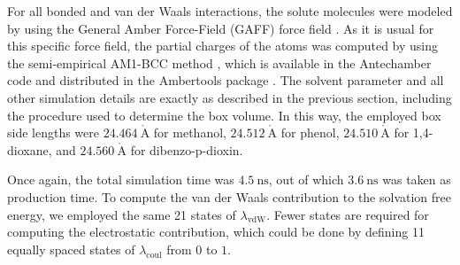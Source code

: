 \documentclass[
aip,
jcp,
reprint,
]{revtex4-1}
\renewcommand{\AA}{\mathring{A}}                       %
\begin{document}
For all bonded and van der Waals interactions, the solute molecules were modeled by using the General Amber Force-Field (GAFF) force field \cite{Wang_2004}.
As it is usual for this specific force field, the partial charges of the atoms was computed by using the semi-empirical AM1-BCC method \cite{Jakalian_2000, *Jakalian_2002}, which is available in the Antechamber code \cite{Wang_2006} and distributed in the Ambertools package \cite{Case_2017}.
The solvent parameter and all other simulation details are exactly as described in the previous section, including the procedure used to determine the box volume.
In this way, the employed box side lengths were $24.464~\mathrm{\AA}$ for methanol, $24.512~\mathrm{\AA}$ for phenol, $24.510~\mathrm{\AA}$ for 1,4-dioxane, and $24.560~\mathrm{\AA}$ for dibenzo-p-dioxin.

Once again, the total simulation time was $4.5~\mathrm{ns}$, out of which $3.6~\mathrm{ns}$ was taken as production time.
To compute the van der Waals contribution to the solvation free energy, we employed the same 21 states of $\lambda_\mathrm{vdW}$.
Fewer states are required for computing the electrostatic contribution, which could be done by defining 11 equally spaced states of $\lambda_\mathrm{coul}$ from $0$ to $1$.
\end{document}
